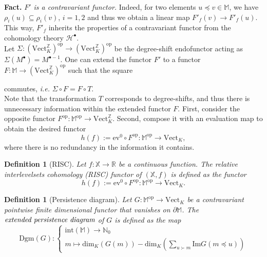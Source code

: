 \documentclass[11pt]{article}
\newtheorem{definition}[theorem]{Definition}
\theoremstyle{remark}
\newcommand{\Z}{\mathbb{Z}}
\newcommand{\N}{\mathbb{N}}
\newcommand{\R}{\mathbb{R}}
\newcommand{\X}{\mathbb{X}}
\newcommand{\M}{\mathbb{M}}
\begin{document}
\noindent \textbf{Fact.} \textit{$F'$ is a contravariant functor.} Indeed, for two elements $u\preceq v\in\M$, we have $\rho_i(u)\subseteq \rho_i(v)$, $i=1,2$ and thus we obtain a linear map $F'_f(v)\longrightarrow F'_f(u)$. This way, $F'_f$ inherits the properties of a contravariant functor from the cohomology theory $\mathcal{H}^\bullet$. \\

\noindent Let $\Sigma:(\mathrm{Vect}_K^\Z)^{\mathrm{op}}\rightarrow (\mathrm{Vect}_K^\Z)^{\mathrm{op}}$ be the degree-shift endofunctor acting as $\Sigma(M^\bullet)=M^{\bullet-1}$. One can extend the functor $F'$ to a functor $F:\M \longrightarrow \left (\mathrm{Vect}_K^\Z\right )^{\mathrm{op}}$ such that the square 

\begin{center}
\end{center}
commutes, \textit{i.e.} $\Sigma\circ F = F\circ T$. \\

\noindent Note that the transformation $T$ corresponds to degree-shifts, and thus there is unnecessary information within the extended functor $F$. First, consider the opposite functor $F^{\mathrm{op}}:\M^{\mathrm{op}}\rightarrow\mathrm{Vect}_K^\Z$. Second, compose it with an evaluation map to obtain the desired functor $$h(f):=\mathrm{ev}^0\circ F^{\mathrm{op}}:\M^{\mathrm{op}}\rightarrow\mathrm{Vect}_K,$$ where there is no redundancy in the information it contains.

\begin{definition}[RISC]
Let $f:\X\rightarrow\R$ be a continuous function. The \emph{relative interlevelsets cohomology (RISC) functor} of $(\X,f)$ is defined as the functor $$h(f):=\mathrm{ev}^0\circ F^{\mathrm{op}}:\M^{\mathrm{op}}\rightarrow\mathrm{Vect}_K.$$
\end{definition}

\begin{definition}[Persistence diagram]
Let $G:\M^{\mathrm{op}}\rightarrow \mathrm{Vect}_K$ be a contravariant pointwise finite dimensional functor  that vanishes on $\partial\M$. The $\emph{extended persistence diagram}$ of $G$ is defined as the map 
\begin{equation*}
    \mathrm{Dgm}(G):
    \begin{cases}
    \mathrm{int}(\M)\rightarrow \N_0\\
    m\mapsto \mathrm{dim}_K(G(m))-\mathrm{dim}_K\left(\sum_{u\succ m} \mathrm{Im} G(m\preceq u)\right)
    \end{cases}
\end{equation*}
\end{definition}
\end{document}
